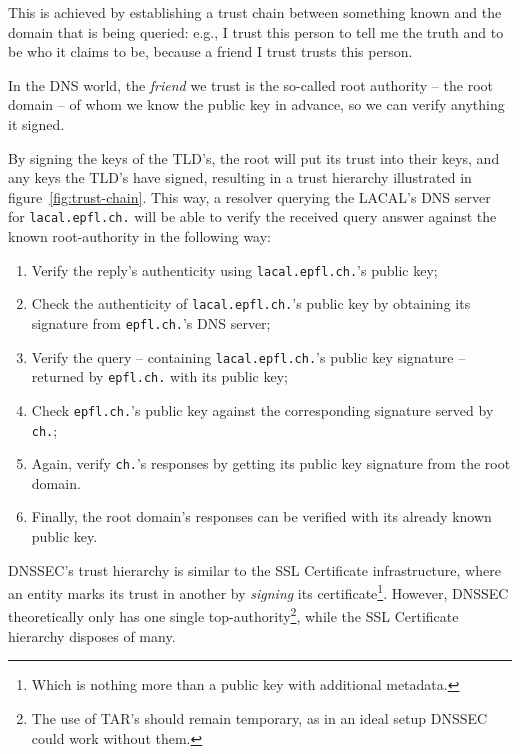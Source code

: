 \documentclass[a4paper,twocolumn]{scrartcl}
\begin{document}
This is achieved by establishing a trust chain between something known and the domain that is being queried: e.g., I trust this person to tell me the truth and to be who it claims to be, because a friend I trust trusts this person.

In the DNS world, the \emph{friend} we trust is the so-called root authority -- the root domain -- of whom we know the public key in advance, so we can verify anything it signed.

By signing the keys of the TLD's, the root will put its trust into their keys, and any keys the TLD's have signed, resulting in a trust hierarchy illustrated in figure~\ref{fig:trust-chain}. This way, a resolver querying the LACAL's DNS server for \verb|lacal.epfl.ch.| will be able to verify the received query answer against the known root-authority in the following way:

\begin{enumerate}
\item Verify the reply's authenticity using \verb|lacal.epfl.ch.|'s
  public key;
\item Check the authenticity of \verb|lacal.epfl.ch.|'s public key by
  obtaining its signature from \verb|epfl.ch.|'s DNS server;
\item Verify the query -- containing \verb|lacal.epfl.ch.|'s public key signature -- returned by \verb|epfl.ch.| with its public key;
\item Check \verb|epfl.ch.|'s public key against the corresponding signature served by \verb|ch.|;
\item Again, verify \verb|ch.|'s responses by getting its public key signature from the root domain.
\item Finally, the root domain's responses can be verified with its already known public key.
\end{enumerate}

DNSSEC's trust hierarchy is similar to the SSL Certificate infrastructure, where an entity marks its trust in another by \emph{signing} its certificate\footnote{Which is nothing more than a public key with additional metadata.}. However, DNSSEC theoretically only has one single top-authority\footnote{The use of TAR's should remain temporary, as in an ideal setup DNSSEC could work without them.}, while the SSL Certificate hierarchy disposes of many.
\end{document}
